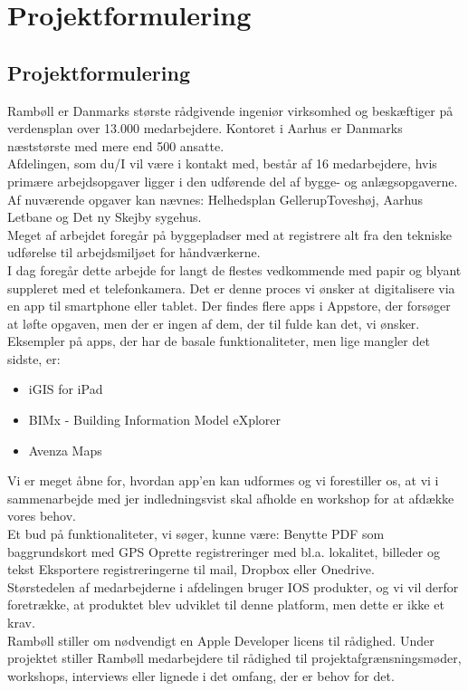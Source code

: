 
	\chapter{Projektformulering}
	
	\section{Projektformulering}
	Rambøll er Danmarks største rådgivende ingeniør virksomhed og beskæftiger på verdensplan over 13.000
	medarbejdere. Kontoret i Aarhus er Danmarks næststørste med mere end 500 ansatte.\\
	Afdelingen, som du/I vil være i kontakt med, består af 16 medarbejdere, hvis primære arbejdsopgaver ligger i
	den udførende del af bygge- og anlægsopgaverne. Af nuværende opgaver kan nævnes: Helhedsplan GellerupToveshøj,
	Aarhus Letbane og Det ny Skejby sygehus.\\
	Meget af arbejdet foregår på byggepladser med at registrere alt fra den tekniske udførelse til arbejdsmiljøet for
	håndværkerne.\\
	I dag foregår dette arbejde for langt de flestes vedkommende med papir og blyant suppleret med et
	telefonkamera.
	Det er denne proces vi ønsker at digitalisere via en app til smartphone eller tablet.
	Der findes flere apps i Appstore, der forsøger at løfte opgaven, men der er ingen af dem, der til fulde kan det, vi
	ønsker. Eksempler på apps, der har de basale funktionaliteter, men lige mangler det sidste, er:
	\begin{itemize}[-]
		\item iGIS for iPad 
		\item BIMx - Building Information Model eXplorer
		\item Avenza Maps
	\end{itemize}
	
	Vi er meget åbne for, hvordan app’en kan udformes og vi forestiller os, at vi i sammenarbejde med jer indledningsvist skal afholde en workshop for at afdække vores behov.\\
	Et bud på funktionaliteter, vi søger, kunne være:
	Benytte PDF som baggrundskort med GPS
	Oprette registreringer med bl.a. lokalitet, billeder og tekst
	Eksportere registreringerne til mail, Dropbox eller Onedrive.\\
	Størstedelen af medarbejderne i afdelingen bruger IOS produkter, og vi vil derfor foretrække, at produktet blev
	udviklet til denne platform, men dette er ikke et krav. \\
	Rambøll stiller om nødvendigt en Apple Developer licens til rådighed.
	Under projektet stiller Rambøll medarbejdere til rådighed til projektafgrænsningsmøder, workshops, interviews
	eller lignede i det omfang, der er behov for det. 


